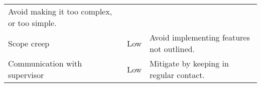 \begin{longtable}[]{@{}lll@{}}
\begin{minipage}[t]{0.50\columnwidth}
Avoid making it too complex, or too simple.\strut
\end{minipage}\tabularnewline
\begin{minipage}[t]{0.28\columnwidth}\raggedright\strut
Scope creep\strut
\end{minipage} & \begin{minipage}[t]{0.13\columnwidth}\raggedright\strut
Low\strut
\end{minipage} & \begin{minipage}[t]{0.50\columnwidth}\raggedright\strut
Avoid implementing features not outlined.\strut
\end{minipage}\tabularnewline
\begin{minipage}[t]{0.28\columnwidth}\raggedright\strut
Communication with supervisor\strut
\end{minipage} & \begin{minipage}[t]{0.13\columnwidth}\raggedright\strut
Low\strut
\end{minipage} & \begin{minipage}[t]{0.50\columnwidth}\raggedright\strut
Mitigate by keeping in regular contact.\strut
\end{minipage}\tabularnewline
\bottomrule
\end{longtable}
